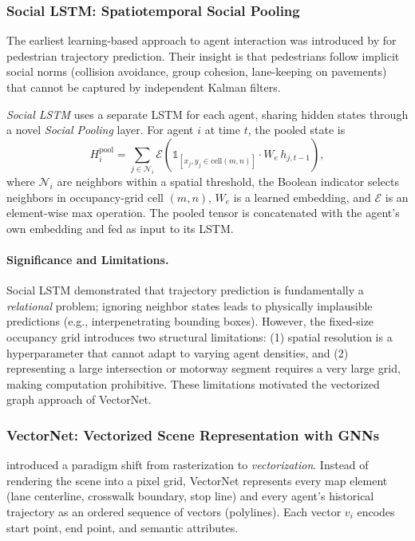 \documentclass[12pt, a4paper]{article}
\begin{document}
\subsubsection{Social LSTM: Spatiotemporal Social Pooling}
\label{sec:social}

The earliest learning-based approach to agent interaction was introduced by
\citet{alahi2016social} for pedestrian trajectory prediction. Their insight is that
pedestrians follow implicit social norms (collision avoidance, group cohesion,
lane-keeping on pavements) that cannot be captured by independent Kalman filters.

\emph{Social LSTM} uses a separate LSTM for each agent, sharing hidden states
through a novel \emph{Social Pooling} layer. For agent $i$ at time $t$, the pooled
state is
\begin{equation}
  H_i^{\text{pool}} =
    \sum_{j \in \mathcal{N}_i}
    \mathcal{E}\!\left( \mathbb{1}_{[x_j, y_j \in \text{cell}(m,n)]} \cdot
                  W_e\, h_{j,t-1} \right),
\end{equation}
where $\mathcal{N}_i$ are neighbors within a spatial threshold, the Boolean
indicator selects neighbors in occupancy-grid cell $(m,n)$, $W_e$ is a learned
embedding, and $\mathcal{E}$ is an element-wise max operation. The pooled tensor
is concatenated with the agent's own embedding and fed as input to its LSTM.

\paragraph{Significance and Limitations.}
Social LSTM demonstrated that trajectory prediction is fundamentally a
\emph{relational} problem; ignoring neighbor states leads to physically
implausible predictions (e.g., interpenetrating bounding boxes). However, the
fixed-size occupancy grid introduces two structural limitations: (1) spatial
resolution is a hyperparameter that cannot adapt to varying agent densities, and
(2) representing a large intersection or motorway segment requires a very large
grid, making computation prohibitive. These limitations motivated the vectorized
graph approach of VectorNet.

\subsubsection{VectorNet: Vectorized Scene Representation with GNNs}
\label{sec:vectornet}

\citet{gao2020vectornet} introduced a paradigm shift from rasterization to
\emph{vectorization}. Instead of rendering the scene into a pixel grid, VectorNet
represents every map element (lane centerline, crosswalk boundary, stop line) and
every agent's historical trajectory as an ordered sequence of vectors (polylines).
Each vector $v_i$ encodes start point, end point, and semantic attributes.
\end{document}
